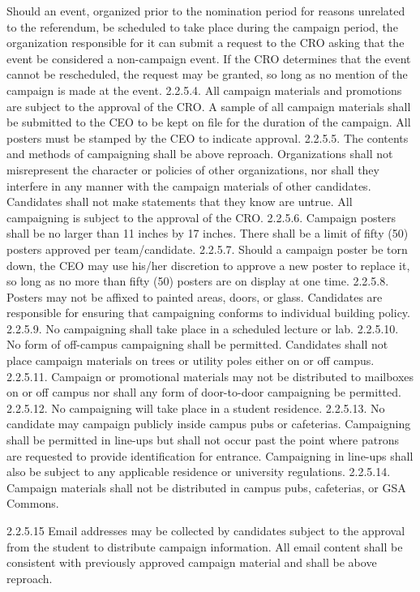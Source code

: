  Should an event, organized prior to the nomination period for 
 reasons unrelated to the referendum, be scheduled to take place 
 during the campaign period, the organization responsible for it 
 can submit a request to the CRO asking that the event be 
 considered a non-campaign event. If the CRO determines that the 
 event cannot be rescheduled, the request may be granted, so long 
 as no mention of the campaign is made at the event. 
 2.2.5.4. All campaign materials and promotions are subject to the approval 
 of the CRO. A sample of all campaign materials shall be submitted 
 to the CEO to be kept on file for the duration of the campaign. All 
 posters must be stamped by the CEO to indicate approval. 
 2.2.5.5. The contents and methods of campaigning shall be above reproach. 
 Organizations shall not misrepresent the character or policies of 
 other organizations, nor shall they interfere in any manner with the 
 campaign materials of other candidates. Candidates shall not make 
 statements that they know are untrue. All campaigning is subject to 
 the approval of the CRO. 
 2.2.5.6. Campaign posters shall be no larger than 11 inches by 17 inches. 
 There shall be a limit of fifty (50) posters approved per 
 team/candidate. 
 2.2.5.7. Should a campaign poster be torn down, the CEO may use his/her 
 discretion to approve a new poster to replace it, so long as no more 
 than fifty (50) posters are on display at one time. 
 2.2.5.8. Posters may not be affixed to painted areas, doors, or glass. 
 Candidates are responsible for ensuring that campaigning 
 conforms to individual building policy. 
 2.2.5.9. No campaigning shall take place in a scheduled lecture or lab. 
 2.2.5.10. No form of off-campus campaigning shall be permitted. 
 Candidates shall not place campaign materials on trees or utility 
 poles either on or off campus. 
 2.2.5.11. Campaign or promotional materials may not be distributed to 
 mailboxes on or off campus nor shall any form of door-to-door 
 campaigning be permitted. 
 2.2.5.12. No campaigning will take place in a student residence. 
 2.2.5.13. No candidate may campaign publicly inside campus pubs or 
 cafeterias. Campaigning shall be permitted in line-ups but shall not 
 occur past the point where patrons are requested to provide 
 identification for entrance. Campaigning in line-ups shall also be 
 subject to any applicable residence or university regulations. 
 2.2.5.14. Campaign materials shall not be distributed in campus pubs, 
 cafeterias, or GSA Commons. 
 
 2.2.5.15 Email addresses may be collected by candidates subject to the 
 approval from the student to distribute campaign information. All 
 email content shall be consistent with previously approved 
 campaign material and shall be above reproach. 
 
